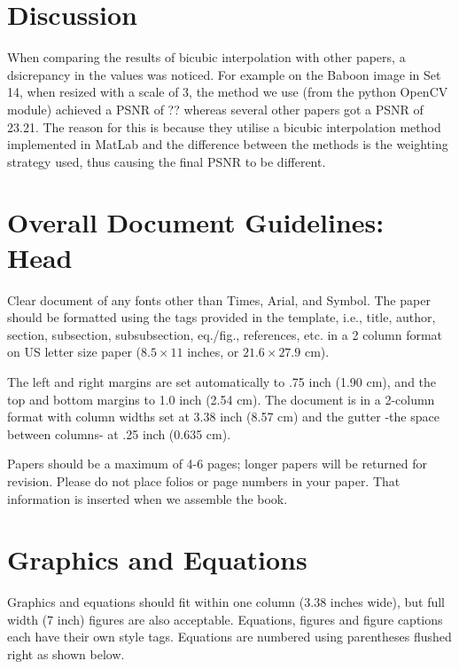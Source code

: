 \documentclass[letterpaper,twocolumn,fleqn]{article}
\begin{document}
\section{Discussion}

When comparing the results of bicubic interpolation with other papers, a dsicrepancy in the values was
noticed. For example on the Baboon image in Set 14, when resized with a scale of 3, the method we use (from
the python OpenCV module) achieved a PSNR of ?? whereas several other papers got  a PSNR of 23.21.
The reason for this is because they utilise a bicubic interpolation method implemented in MatLab and the difference between the methods is the weighting strategy used, thus causing the final PSNR to be different.



\section{Overall Document Guidelines: Head}
\label{sec:intro}

Clear document of any fonts other than Times, Arial, and Symbol. The
paper should be formatted using the tags provided in the template,
i.e., title, author, section, subsection, subsubsection, eq./fig.,
references, etc.  in a 2 column format on US letter size paper ($8.5
\times 11$ inches, or $21.6 \times 27.9$ cm).

The left and right margins are set automatically to .75 inch (1.90 cm),
and the top and bottom margins to 1.0 inch (2.54 cm). The document is in
a 2-column format with column widths set at 3.38 inch (8.57 cm) and the
gutter -the space between columns- at .25 inch (0.635 cm).

Papers should be a maximum of 4-6 pages; longer papers will be
returned for revision. Please do not place folios or page numbers in
your paper. That information is inserted when we assemble the book.


\section{Graphics and Equations}
Graphics and equations should fit within one column (3.38 inches
wide), but full width (7 inch) figures are also acceptable. Equations,
figures and figure captions each have their own style tags. Equations
are numbered using parentheses flushed right as shown below.
\end{document}
